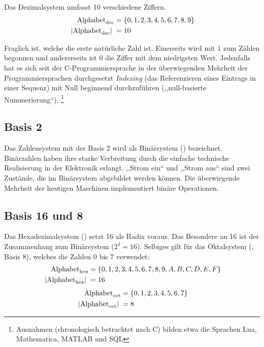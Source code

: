 Das Dezimalsystem umfasst 10 verschiedene Ziffern.
\begin{align*}
         \text{Alphabet}_{\text{dec}} &= \{0, 1, 2, 3, 4, 5, 6, 7, 8, 9\} \\
  \hspace{3pt}\left| \text{Alphabet}_{\text{dec}}\right|\hspace{3pt} &= 10 
\end{align*}

Fraglich ist, welche die erste natürliche Zahl ist. Einerseits wird mit $1$ zum
Zählen begonnen und andererseits ist $0$ die Ziffer mit dem niedrigsten Wert.
Jedenfalls hat es sich seit der C-Programmiersprache in der überwiegenden
Mehrheit der Programmiersprachen durchgesetzt \emph{Indexing} (das
Referenzieren eines Eintrags in einer Sequenz) mit Null beginnend durchzuführen
(,,null-basierte Nummerierung``).%
\footnote{Ausnahmen (chronologisch betrachtet nach C) bilden etwa die Sprachen
Lua, Mathematica, MATLAB und SQL}
%
\subsection{Basis 2}
%
Das Zahlensystem mit der Basis 2 wird als Binärsystem () bezeichnet.
Binärzahlen  haben ihre starke Verbreitung durch die einfache technische
Realisierung in der Elektronik erlangt. ,,Strom ein`` und ,,Strom aus``
sind zwei Zustände, die im Binärsystem abgebildet werden können.
Die überwiegende Mehrheit der heutigen Maschinen
implementiert binäre Operationen.
%
\subsection{Basis 16 und 8}
%
Das Hexadezimalsystem () setzt 16 als Radix voraus. Das Besondere an
16 ist der Zusammenhang zum Binärsystem ($2^4 = 16$). Selbiges gilt für
das Oktalsystem (, Basis 8), welches die Zahlen 0 bis 7 verwendet:
%
\begin{align*}
  \text{Alphabet}_{\text{hex}} &= \{0, 1, 2, 3, 4, 5, 6, 7, 8, 9, A, B, C, D, E, F\} \\
  \hspace{3pt}\left| \text{Alphabet}_{\text{hex}}\right|\hspace{3pt} &= 16 
\end{align*}
%
\begin{align*}
  \text{Alphabet}_{\text{oct}} &= \{0, 1, 2, 3, 4, 5, 6, 7\} \\
  \hspace{3pt}\left| \text{Alphabet}_{\text{oct}}\right|\hspace{3pt} &= 8
\end{align*}
%
